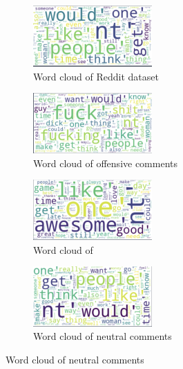 \documentclass[11pt, natbib=false]{article}
\begin{document}
\newpage

\begin{figure}[h!]\ContinuedFloat
  \centering

  \begin{subfigure}[b]{1.0\linewidth}
  \centering
  \caption{Word cloud of Reddit dataset}
  \includegraphics[width=0.5\textwidth]{./wordcloud_reddit.png}
  \end{subfigure}
  \begin{subfigure}[b]{1.0\linewidth}
  \centering
  \caption{Word cloud of offensive comments}
  \includegraphics[width=0.5\textwidth]{./wordcloud_offensive.png}
  \end{subfigure}
  \begin{subfigure}[b]{1.0\linewidth}
  \centering
  \caption{Word cloud of }
  \includegraphics[width=0.5\textwidth]{./wordcloud_nonoffensive.png}
  \end{subfigure}
  \begin{subfigure}[b]{1.0\linewidth}
  \centering
  \caption{Word cloud of neutral comments}
  \includegraphics[width=0.5\textwidth]{./wordcloud_neutral.png}
  \end{subfigure}

\end{figure}
\end{document}
